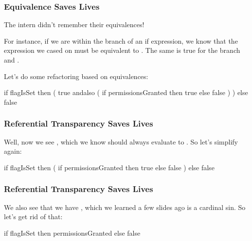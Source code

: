\documentclass[aspectratio=169, handout]{beamer}
\begin{document}
\begin{frame}[fragile]
  \frametitle{Equivalence Saves Lives}

  The intern didn't remember their equivalences!

  \pause
  \vspace{\fill}

  For instance, if we are within the  branch of
  an if expression, we know that the expression we cased on
  must be equivalent to . The same is true for
  the  branch and .

  \vspace{\fill}

  Let's do some refactoring based on equivalences:
  \pause
  \begin{codeblock}
    if flagIsSet then (
      true andalso (
        if permissionsGranted then
          true
        else
          false
      )
    ) else false
  \end{codeblock}
\end{frame}

\begin{frame}[fragile]
  \frametitle{Referential Transparency Saves Lives}

  Well, now we see , which we know should
  always evaluate to . So let's simplify again:

  \pause
  \vspace{\fill}

  \begin{codeblock}
    if flagIsSet then (
      if permissionsGranted then
        true
      else
        false
    ) else false
  \end{codeblock}
\end{frame}

\begin{frame}[fragile]
  \frametitle{Referential Transparency Saves Lives}

  We also see that we have ,
  which we learned a few slides ago is a cardinal sin. So let's
  get rid of that:

  \pause
  \vspace{\fill}

  \begin{codeblock}
    if flagIsSet then permissionsGranted
    else false
  \end{codeblock}
\end{frame}
\end{document}
